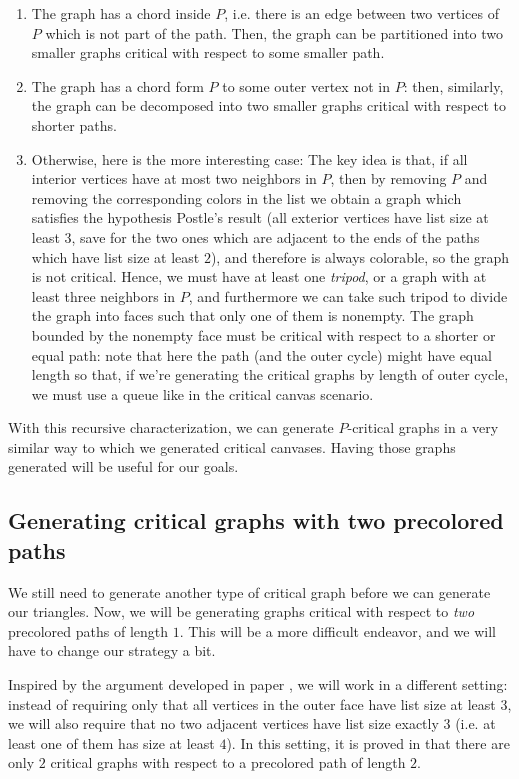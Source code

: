 \documentclass{article}
\begin{document}
\begin{enumerate}
\item The graph has a chord inside $P$, i.e. there is an edge between two vertices of $P$ which is not part of the path. Then, the graph can be partitioned into two smaller graphs critical with respect to some smaller path.
\item The graph has a chord form $P$ to some outer vertex not in $P$: then, similarly, the graph can be decomposed into two smaller graphs critical with respect to shorter paths.
\item Otherwise, here is the more interesting case: The key idea is that, if all interior vertices have at most two neighbors in $P$, then by removing $P$ and removing the corresponding colors in the list we obtain a graph which satisfies the hypothesis Postle's result (all exterior vertices have list size at least $3$, save for the two ones which are adjacent to the ends of the paths which have list size at least $2$), and therefore is always colorable, so the graph is not critical. Hence, we must have at least one \emph{tripod}, or a graph with at least three neighbors in $P$, and furthermore we can take such tripod to divide the graph into faces such that only one of them is nonempty. The graph bounded by the nonempty face must be critical with respect to a shorter or equal path: note that here the path (and the outer cycle) might have equal length so that, if we're generating the critical graphs by length of outer cycle, we must use a queue like in the critical canvas scenario.
\end{enumerate}

With this recursive characterization, we can generate $P$-critical graphs in a very similar way to which we generated critical canvases. Having those graphs generated will be useful for our goals.

\subsection{Generating critical graphs with two precolored paths}

We still need to generate another type of critical graph before we can generate our triangles. Now, we will be generating graphs critical with respect to \emph{two} precolored paths of length $1$. This will be a more difficult endeavor, and we will have to change our strategy a bit.

Inspired by the argument developed in paper \cite{crossingsfarapart}, we will work in a different setting: instead of requiring only that all vertices in the outer face have list size at least $3$, we will also require that no two adjacent vertices have list size exactly $3$ (i.e. at least one of them has size at least $4$). In this setting, it is proved in \cite{crossingsfarapart} that there are only $2$ critical graphs with respect to a precolored path of length $2$. 
\end{document}
